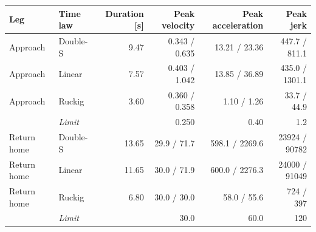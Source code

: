 \begin{tabular}{@{}llrrrr@{}}
\toprule
\textbf{Leg} & \textbf{Time law} & \textbf{Duration [s]} & \textbf{Peak velocity} & \textbf{Peak acceleration} & \textbf{Peak jerk} \\
\midrule
Approach & Double-S & 9.47 & 0.343 / 0.635 & 13.21 / 23.36 & 447.7 / 811.1 \\
Approach & Linear & 7.57 & 0.403 / 1.042 & 13.85 / 36.89 & 435.0 / 1301.1 \\
Approach & Ruckig & 3.60 & 0.360 / 0.358 & 1.10 / 1.26 & 33.7 / 44.9 \\
& \emph{Limit} & & 0.250 & 0.40 & 1.2 \\
\midrule
Return home & Double-S & 13.65 & 29.9 / 71.7 & 598.1 / 2269.6 & 23924 / 90782 \\
Return home & Linear & 11.65 & 30.0 / 71.9 & 600.0 / 2276.3 & 24000 / 91049 \\
Return home & Ruckig & 6.80 & 30.0 / 30.0 & 58.0 / 55.6 & 724 / 397 \\
& \emph{Limit} & & 30.0 & 60.0 & 120 \\
\bottomrule
\end{tabular}
